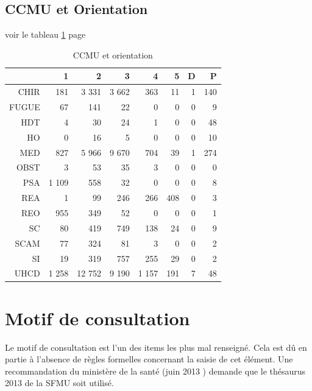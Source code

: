 \documentclass[12pt,english,french,twoside]{book}\usepackage[]{graphicx}\usepackage[]{color}
\begin{document}
\section{CCMU et Orientation}

voir le tableau \ref{tab:ccmu_orient} page \pageref{tab:ccmu_orient}

\begin{table}[ht]
\centering
\begin{tabular}{rrrrrrrr}
  \hline
 & 1 & 2 & 3 & 4 & 5 & D & P \\ 
  \hline
CHIR & 181 & 3 331 & 3 662 & 363 & 11 & 1 & 140 \\ 
  FUGUE & 67 & 141 & 22 & 0 & 0 & 0 & 9 \\ 
  HDT & 4 & 30 & 24 & 1 & 0 & 0 & 48 \\ 
  HO & 0 & 16 & 5 & 0 & 0 & 0 & 10 \\ 
  MED & 827 & 5 966 & 9 670 & 704 & 39 & 1 & 274 \\ 
  OBST & 3 & 53 & 35 & 3 & 0 & 0 & 0 \\ 
  PSA & 1 109 & 558 & 32 & 0 & 0 & 0 & 8 \\ 
  REA & 1 & 99 & 246 & 266 & 408 & 0 & 3 \\ 
  REO & 955 & 349 & 52 & 0 & 0 & 0 & 1 \\ 
  SC & 80 & 419 & 749 & 138 & 24 & 0 & 9 \\ 
  SCAM & 77 & 324 & 81 & 3 & 0 & 0 & 2 \\ 
  SI & 19 & 319 & 757 & 255 & 29 & 0 & 2 \\ 
  UHCD & 1 258 & 12 752 & 9 190 & 1 157 & 191 & 7 & 48 \\ 
   \hline
\end{tabular}
\caption[CCMU et orientation]{CCMU et orientation} 
\label{tab:ccmu_orient}
\end{table}


\newpage
\chapter{Motif de consultation}



Le motif de consultation est l'un des items les plus mal renseigné. Cela est dû en partie à l'absence de règles formelles concernant la saisie de cet élément. Une recommandation du ministère de la santé (juin 2013 \cite{12,13}) demande que le thésaurus 2013 de la SFMU \cite{9} soit utilisé.
\end{document}
